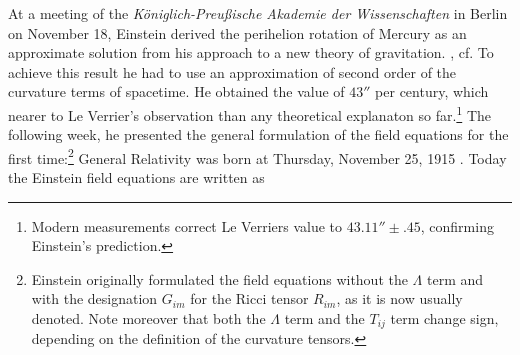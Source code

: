 At a meeting of the \emph{K\"oniglich-Preu{\ss}ische Akademie der Wissenschaften} %
in Berlin on November 18, Einstein derived the perihelion rotation of Mercury as an approximate solution from his approach to a new theory of gravitation. \cite[Eq. (13)]{Einstein-1915b}, cf. \cite[362-366]{Scheck-3-2017}
To achieve this result he had to use an approximation of second order of the curvature terms of spacetime. He obtained the value of $43''$ per century, which nearer to Le Verrier's observation than any theoretical explanaton so far.\footnote{
	Modern measurements \cite[113]{Sexl-Urbantke-1987} correct Le Verriers value to $43.11'' \pm .45$, confirming Einstein's prediction.
}
The following week, he presented the general formulation of the field equations \cite[Equations (2a) and (6)]{Einstein-1915c} for the first time:\footnote{
	Einstein originally formulated the field equations without the $\Lambda$ term and with the designation $G_{im}$ for the Ricci tensor $R_{im}$, as it is now usually denoted. %
	Note moreover that both the $\Lambda$ term and the $T_{ij}$ term change sign, depending on the definition of the curvature tensors. %
}
General Relativity was born at Thursday, November 25, 1915 
\cite[419]{Foelsing-1993}.
%
Today the Einstein field equations are written as
